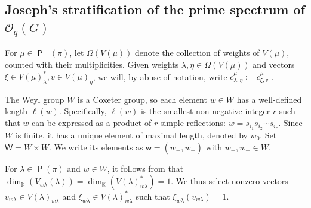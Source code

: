 \documentclass[11pt]{article}
\theoremstyle{definition}
\numberwithin{equation}{section}
\newcommand{\KK}{\mathbb{K}}
\newcommand{\qu}{\mathcal{O}}
\DeclareMathOperator{\pois}{\mathsf{P}}
\newcommand\W{\mathsf{W}}
\newcommand\w{\mathsf{w}}
\begin{document}
	
	
	\subsection{Joseph's stratification of the prime spectrum of $\qu_q(G)$}\label{specqg}
	
	For $\mu\in\pois^{+}(\pi)$, let $\Omega(V(\mu))$ denote the collection of weights of $V(\mu)$,  counted with their multiplicities. Given weights $\lambda,\eta\in\Omega(V(\mu))$ and vectors $\xi\in V(\mu)^{\ast}_{\lambda}, v\in V(\mu)_{\eta}$, we will, by abuse of notation, write $c_{\lambda,\eta}^{\mu}:= c_{\xi,v}^{\mu}$ . 
	
The Weyl group $W$ is a Coxeter group, so each element $w \in W$ has a well-defined length $\ell(w)$. Specifically, $\ell(w)$ is the smallest non-negative integer $r$ such that $w$ can be expressed as a product of $r$ simple reflections: $w = s_{i_1}s_{i_2}\cdots s_{i_r}$. Since $W$ is finite, it has a unique element of maximal length, denoted by $w_0$. Set $\W= W\times W$. We write its elements as $\w= (w_{+},w_{-})$ with $w_+, w_-\in W$.
	
For $\lambda \in\pois(\pi)$ and $w \in W$, it follows from \cite[4.3.6(iv)]{JO95} that $\dim_{\KK}(V_{w\lambda}(\lambda)) = \dim_{\KK}(V(\lambda)^*_{w\lambda}) = 1$. We thus select nonzero vectors $v_{w\lambda} \in V(\lambda)_{w\lambda}$ and $\xi_{w\lambda} \in V(\lambda)^*_{w\lambda}$ such that $\xi_{w\lambda}(v_{w\lambda}) = 1$.
	
\end{document}
